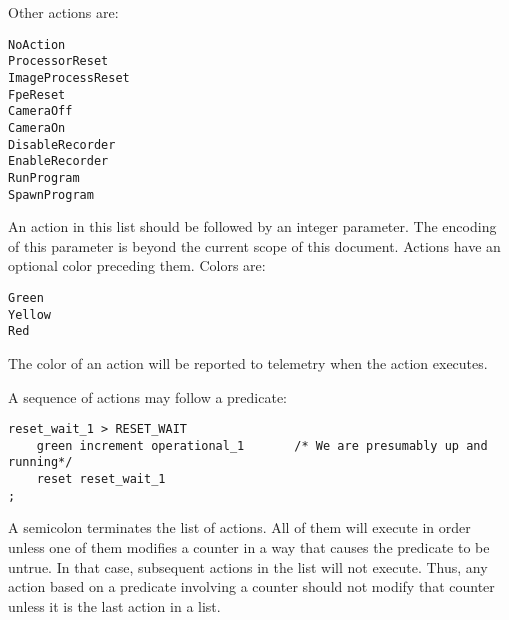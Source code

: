 \documentclass[12pt]{article}
\begin{document}
Other actions are:
\begin{verbatim}
NoAction
ProcessorReset
ImageProcessReset
FpeReset
CameraOff
CameraOn
DisableRecorder
EnableRecorder
RunProgram
SpawnProgram         
\end{verbatim}
An action in this list should be followed by an integer parameter. The encoding of this parameter is beyond the current scope of this document. Actions have an optional color preceding them. Colors are:
\begin{verbatim}
Green
Yellow
Red
\end{verbatim}
The color of an action will be reported to telemetry when the action executes.

A sequence of actions may follow a predicate: 
\begin{verbatim}
reset_wait_1 > RESET_WAIT
	green increment operational_1		/* We are presumably up and running*/
	reset reset_wait_1
;
\end{verbatim}
A semicolon terminates the list of actions. All of them will execute in order unless one of them modifies a counter in a way that causes the predicate to be untrue. In that case, subsequent actions in the list will not execute. Thus, any action based on a predicate involving a counter should not modify that counter unless it is the last action in a list.
\end{document}
